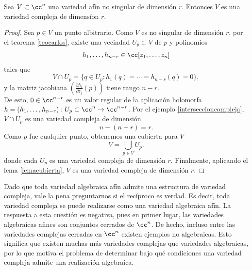     \begin{corollary}\label{analiticoafin}
    	Sea $V\subset \cc^n$ una variedad afín no singular de dimensión $r$. Entonces $V$ es una variedad compleja de dimensíon $r$.
    \end{corollary}
    \begin{proof}
    	Sea $p\in V$ un punto albitrario. Como $V$ es no singular de dimensión $r$, por el teorema \ref{teocarlos}, existe una vecindad $U_p\subset V$ de $p$ y polinomios 
    	\begin{equation*}
    		h_1,\dots,h_{n-r}\in\cc[z_1,\dots,z_n]
    	\end{equation*}
    	tales que
    	\begin{equation*}
    		V\cap U_p=\{q\in U_p:h_1(q)=\cdots=h_{n-r}(q)=0\},
    	\end{equation*}
    	y la matriz jacobiana $(\frac{\partial h_i}{\partial z_j}(p))$ tiene rango $n-r$.\\
    	De esto, $0\in \cc^{n-r}$ es un valor regular de la aplicación holomorfa $h=(h_1,\dots,h_{n-r}):U_p\subset\cc^n\to\cc^{n-r}$. Por el ejemplo \ref{interseccioncompleja}, $V\cap U_p$ es una variedad compleja de dimensión
    	\begin{equation*}
    		n-(n-r)=r.
    	\end{equation*}
    	Como $p$ fue cualquier punto, obtenemos una cubierta para $V$
    	\begin{equation*}
    		V=\bigcup_{p\in V}U_p.
    	\end{equation*} 
    	donde cada $U_p$ es una variedad compleja de dimensión $r$. Finalmente, aplicando el lema \ref{lemacubierta}, $V$ es una variedad compleja de dimensión $r$.
    \end{proof}
	
	Dado que toda variedad algebraica afín admite una estructura de variedad compleja, vale la pena preguntarnos si el recíproco es verdad. Es decir, toda variedad compleja se puede realizarse como una variedad algebraica afín. La respuesta a esta cuestión es negativa, pues en primer lugar, las variedades algebraicas afines son conjuntos cerrados de $\cc^n$. De hecho, incluso entre las variedades complejas cerradas en $\cc^n$ existen ejemplos no algebraicas. Esto significa que existen muchas más variedades complejas que variedades algebraicas, por lo que motiva el problema de determinar bajo qué condiciones una variedad compleja admite una realización algebraica.
	
